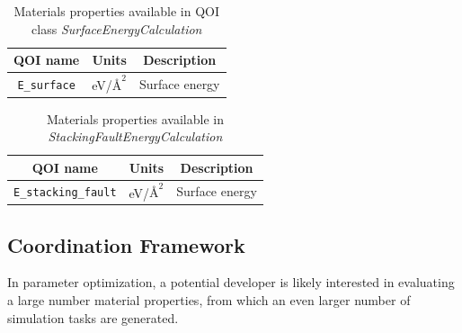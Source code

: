 \begin{table}[p]
	\centering
	\caption{Materials properties available in QOI class \emph{SurfaceEnergyCalculation}}
	\label{tbl:pypospack_qoi_lmps_surface_energy}
	\begin{tabular}{ccc}
		\hline
		QOI name & Units & Description \\
		\hline
		\verb|E_surface|
		  & eV/$\text{\AA}^2$
			& Surface energy \\
		\hline
	\end{tabular}
\end{table}

\begin{table}[p]
	\centering
	\caption{Materials properties available in \emph{StackingFaultEnergyCalculation}}
	\label{tbl:pypospack_qoi_lmps_stacking_fault}
	\begin{tabular}{ccc}
		\hline
		QOI name & Units & Description \\
		\hline
		\verb|E_stacking_fault|
		& eV/$\text{\AA}^2$
		& Surface energy \\
		\hline
	\end{tabular}
\end{table}

\subsection{Coordination Framework}

In parameter optimization, a potential developer is likely interested in evaluating a large number material properties, from which an even larger number of simulation tasks are generated.

